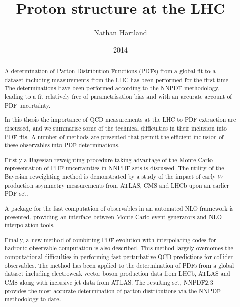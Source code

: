 \documentclass[12pt,oneside,openright]{report}
\title{Proton structure at the LHC}
\author{Nathan Hartland}
\date{2014}
\begin{document}
\maketitle
\setcounter{page}{1}
\dedication{To my parents}

\declaration

\acknowledgements

\begin{spacing}{1.5}

\begin{abstract}
A determination of Parton Distribution Functions (PDFs) from a global fit to a dataset including measurements from the LHC has been performed for the first time. The determinations
have been performed according to the NNPDF methodology, leading to a fit relatively free of parametrisation bias and with an accurate account of PDF uncertainty.

In this thesis the importance of QCD measurements at the LHC to PDF extraction are discussed, and we summarise some of the technical difficulties in their inclusion into PDF fits. A number of methods are presented that permit the efficient inclusion of these observables
into PDF determinations. 

Firstly a Bayesian reweighting procedure taking advantage of the Monte Carlo representation of PDF uncertainties in NNPDF sets is discussed. The utility of the Bayesian reweighting method is demonstrated by a study of the impact of early $W$ production asymmetry measurements from ATLAS, CMS and LHCb upon an earlier PDF set.

A package for the fast computation of observables in an automated NLO framework is presented, providing an interface between Monte Carlo event generators and NLO interpolation tools.

Finally, a new method of combining PDF evolution with interpolating codes for hadronic observable computation is also described. This method largely overcomes the computational difficulties in performing fast perturbative QCD predictions for collider observables. The method has been applied to the determination of PDFs from a global dataset including electroweak vector boson production data from LHCb, ATLAS and CMS along with inclusive jet data from ATLAS. The resulting set, NNPDF2.3 provides the most accurate determination of parton distributions via the NNPDF methodology to date.


\end{abstract}
\end{spacing}
\end{document}
